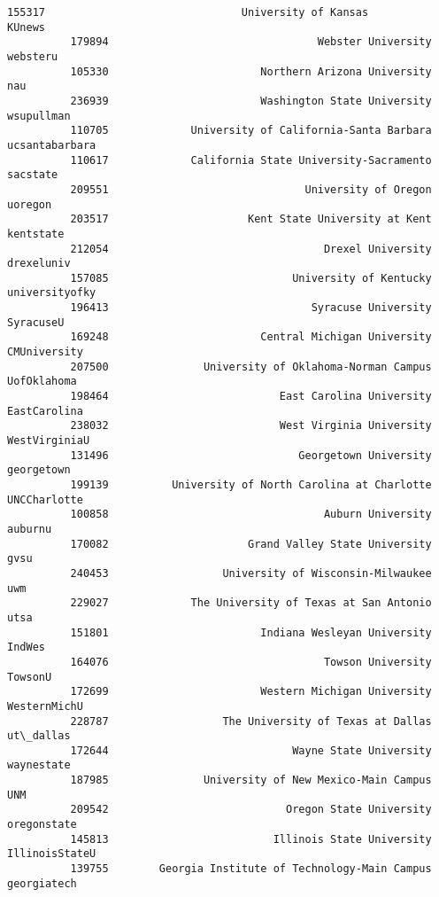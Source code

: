 \documentclass[11pt]{article}
\begin{document}
\begin{Verbatim}[commandchars=\\\{\}]
          155317                               University of Kansas           KUnews   
          179894                                 Webster University         websteru   
          105330                        Northern Arizona University              nau   
          236939                        Washington State University       wsupullman   
          110705             University of California-Santa Barbara   ucsantabarbara   
          110617             California State University-Sacramento         sacstate   
          209551                               University of Oregon          uoregon   
          203517                      Kent State University at Kent        kentstate   
          212054                                  Drexel University       drexeluniv   
          157085                             University of Kentucky   universityofky   
          196413                                Syracuse University        SyracuseU   
          169248                        Central Michigan University     CMUniversity   
          207500               University of Oklahoma-Norman Campus      UofOklahoma   
          198464                           East Carolina University     EastCarolina   
          238032                           West Virginia University    WestVirginiaU   
          131496                              Georgetown University       georgetown   
          199139          University of North Carolina at Charlotte     UNCCharlotte   
          100858                                  Auburn University          auburnu   
          170082                      Grand Valley State University             gvsu   
          240453                  University of Wisconsin-Milwaukee              uwm   
          229027             The University of Texas at San Antonio             utsa   
          151801                        Indiana Wesleyan University           IndWes   
          164076                                  Towson University          TowsonU   
          172699                        Western Michigan University     WesternMichU   
          228787                  The University of Texas at Dallas        ut\_dallas   
          172644                             Wayne State University       waynestate   
          187985               University of New Mexico-Main Campus              UNM   
          209542                            Oregon State University      oregonstate   
          145813                          Illinois State University   IllinoisStateU   
          139755        Georgia Institute of Technology-Main Campus      georgiatech   

\end{Verbatim}
\end{document}

